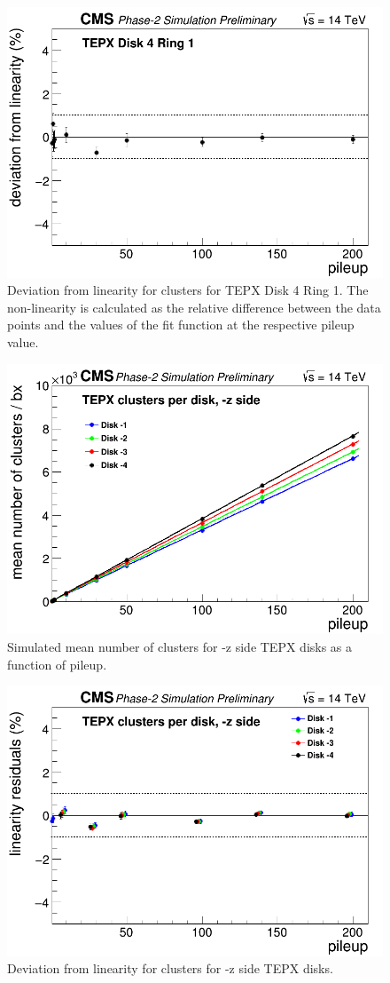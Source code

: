 \begin{figure}[H]
  \centering
  \includegraphics[width=0.5\columnwidth]{./TEPX_Disk_4_Ring_1_mean_number_of_clusters___bx_Linearity_residuals.png}
  \caption{Deviation from linearity for clusters for TEPX Disk 4 Ring 1. The non-linearity is calculated as the relative difference between the data points and the values of the fit function at the respective pileup value.}
  \label{fig:CMS}
\end{figure}






\begin{figure}[H]
  \centering
  \includegraphics[width=0.5\columnwidth]{./TEPX_clusters_negativez_Linearity.png}
  \caption{Simulated mean number of clusters for -z side TEPX disks as a function of pileup.}
  \label{fig:CMS}
\end{figure}


\begin{figure}[H]
  \centering
  \includegraphics[width=0.5\columnwidth]{./TEPX_clusters_per_disk_negativez_Linearity_residuals.png}
  \caption{Deviation from linearity for clusters for -z side TEPX disks.}
  \label{fig:CMS}
\end{figure}

